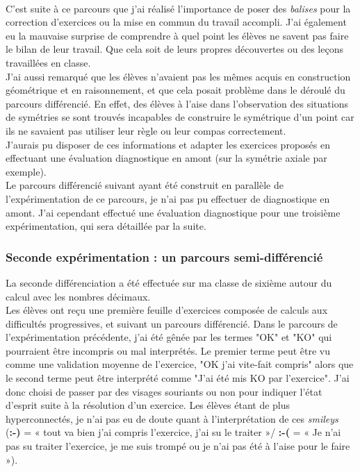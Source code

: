 \paragraph{}C'est suite à ce parcours que j'ai réalisé l'importance de poser des \textit{balises} pour la correction d'exercices ou la mise en commun du travail accompli. J'ai également eu la mauvaise surprise de comprendre à quel point les élèves ne savent pas faire le bilan de leur travail. Que cela soit de leurs propres découvertes ou des leçons travaillées en classe.\\
J'ai aussi remarqué que les élèves n'avaient pas les mêmes acquis en construction géométrique et en raisonnement, et que cela posait problème dans le déroulé du parcours différencié. En effet, des élèves à l'aise dans l'observation des situations de symétries se sont trouvés incapables de construire le symétrique d'un point car ils ne savaient pas utiliser leur règle ou leur compas correctement.\\
J'aurais pu disposer de ces informations et adapter les exercices proposés en effectuant une évaluation diagnostique en amont (sur la symétrie axiale par exemple).\\
Le parcours différencié suivant ayant été construit en parallèle de l'expérimentation de ce parcours, je n'ai pas pu effectuer de diagnostique en amont. J'ai cependant effectué une évaluation diagnostique pour une troisième expérimentation, qui sera détaillée par la suite.\\


\subsubsection{Seconde expérimentation : un parcours semi-différencié}
La seconde différenciation a été effectuée sur ma classe de sixième autour du calcul avec les nombres décimaux.\\
Les élèves ont reçu une première feuille d'exercices composée de calculs aux difficultés progressives, et suivant un parcours différencié. Dans le parcours de l'expérimentation précédente, j'ai été gênée par les termes "OK" et "KO" qui pourraient être incompris ou mal interprétés. Le premier terme peut être vu comme une validation moyenne de l'exercice, "OK j'ai vite-fait compris" alors que le second terme peut être interprété comme "J'ai été mis KO par l'exercice". J'ai donc choisi de passer par des visages souriants ou non pour indiquer l'état d'esprit suite à la résolution d'un exercice. Les élèves étant de plus hyperconnectés, je n'ai pas eu de doute quant à l'interprétation de ces \textit{smileys} (\textbf{:-)} = « tout va bien j'ai compris l'exercice, j'ai su le traiter »/  \textbf{:-(} = « Je n'ai pas su traiter l'exercice, je me suis trompé ou je n'ai pas été à l'aise pour le faire »).
